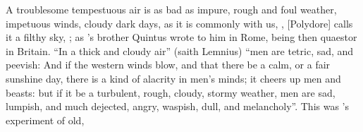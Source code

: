 A troublesome tempestuous air is as bad as impure, rough and foul weather,
impetuous winds, cloudy dark days, as it is commonly with us, , [Polydore] calls it a
filthy sky, ; as \Tully{}'s brother Quintus
wrote to him in Rome, being then quaestor in Britain. \enquote{In a thick and cloudy
air} (saith Lemnius) \enquote{men are tetric, sad, and peevish: And if the western
winds blow, and that there be a calm, or a fair sunshine day, there is a kind
of alacrity in men's minds; it cheers up men and beasts: but if it be a
turbulent, rough, cloudy, stormy weather, men are sad, lumpish, and much
dejected, angry, waspish, dull, and melancholy}. This was
\Virgil{}'s experiment of old,


